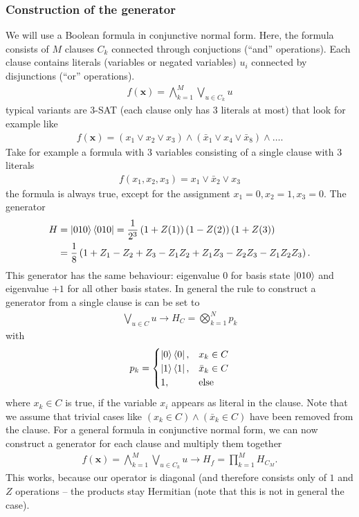 \subsubsection*{Construction of the generator}
We will use a Boolean formula in conjunctive normal form. Here, the formula consists of $M$ clauses $C_k$ connected through conjuctions (``and'' operations). Each clause contains literals (variables or negated variables) $u_i$ connected by disjunctions (``or'' operations). 
\begin{align*}
    f(\mathbf{x}) = \bigwedge_{k=1}^{M} \bigvee_{u\in C_k} u
\end{align*}
typical variants are $3$-SAT (each clause only has 3 literals at most) that look for example like
\begin{align*}
    f(\mathbf{x}) = \left(x_1 \vee x_2 \vee x_3\right) \wedge \left(\bar{x}_1 \vee x_4 \vee \bar{x}_8\right) \wedge \dots .
\end{align*}
Take for example a formula with 3 variables consisting of a single clause with 3 literals
\begin{align*}
    f(x_1,x_2,x_3) = x_1 \vee \bar{x}_2 \vee x_3
\end{align*}
the formula is always true, except for the assignment $x_1=0, x_2=1, x_3=0$. The generator 
\begin{align}
    H &= \ket{010}\bra{010} = \frac{1}{2^3}\left(1+Z(1)\right)\left(1-Z(2)\right)\left(1+Z(3)\right)\nonumber\\
    &= \frac{1}{8}\left(1+Z_1-Z_2+Z_3-Z_1Z_2+Z_1Z_3 - Z_2Z_3 - Z_1Z_2Z_3\right).
\end{align}
This generator has the same behaviour: eigenvalue 0 for basis state $\ket{010}$ and eigenvalue $+1$ for all other basis states.
In general the rule to construct a generator from a single clause is can be set to
\begin{align}
    \bigvee_{u\in C}^{} u \rightarrow H_C = \bigotimes_{k=1}^N p_k
\end{align}
with 
\begin{align}
    p_k = \begin{cases}
        \ket{0}\bra{0}, & x_k \in C\\
        \ket{1}\bra{1}, & \bar{x}_k \in C\\
        1, & \text{else}
    \end{cases}
\end{align}
where $x_k\in C$ is true, if the variable $x_i$ appears as literal in the clause. Note that we assume that trivial cases like $(x_k \in C) \wedge (\bar{x}_k\in C)$ have been removed from the clause.
For a general formula in conjunctive normal form, we can now construct a generator for each clause and multiply them together 
\begin{align*}
    f(\mathbf{x}) = \bigwedge_{k=1}^{M} \bigvee_{u\in C_k} u \rightarrow H_f = \prod_{k=1}^{M} H_{C_M}.
\end{align*}
This works, because our operator is diagonal (and therefore consists only of $1$ and $Z$ operations -- the products stay Hermitian (note that this is not in general the case).
